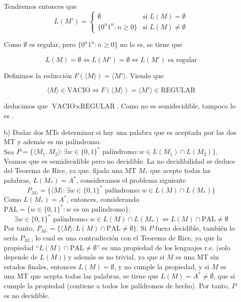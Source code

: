 \begin{ejercicio}
\begin{itemize}
        Tendremos entonces que $$L(M') = \begin{cases}
            \emptyset &\text{si } L(M) = \emptyset \\
            \{0^n 1^n : n \geq 0\} &\text{si } L(M) \neq \emptyset 
        \end{cases}$$

        Como $\emptyset$ es regular, pero $\{0^n 1^n : n \geq 0\}$ no lo es, se tiene que 

        $$L(M) = \emptyset \iff L(M') = \emptyset \iff L(M') \text{ es regular}$$

        Definimos la reducción $F(\langle M \rangle) = \langle M' \rangle$. Viendo que

        $$\langle M \rangle \in \text{VACIO} \iff F(\langle M \rangle) = \langle M' \rangle \in \text{REGULAR}$$

        deducimos que $\text{VACIO} \propto \text{REGULAR}$. Como  no es semidecidible, tampoco lo es 
        .

        \item[b)] Dadas dos MTs determinar si hay una palabra que es aceptada por las dos MT y 
        además es un palíndromo. \\ %

        Sea $P = \{\langle M_1, M_2 \rangle : \exists w \in \{0,1\}^{*} \text{ palíndromo} : w \in L(M_1) \cap L(M_2)\}$. 
        Veamos que es semidecidible pero no decidible. La no decidibilidad se deduce del Teorema de Rice, ya que, 
        fijada una MT $M_{*}$ que acepte todas las palabras, $L(M_*) = A^{*}$, consideramos el problema siguiente 
        $$P_{M_*} = \{\langle M \rangle : \exists w \in \{0,1\}^{*} \text{ palíndromo} : w \in L(M) \cap L(M_*)\}$$ 
        Como $L(M_*) = A^{*}$, entonces, considerando $\text{PAL} = \{w \in \{0,1\}^{*} : w \text{ es un palíndromo}\}$:
        $$\exists w \in \{0,1\}^{*} \text{ palíndromo} : w \in L(M) \cap L(M_*) \iff L(M) \cap \text{PAL} \neq \emptyset$$ 
        Por tanto, $P_{M_*} = \{\langle M \rangle : L(M) \cap \text{PAL} \neq \emptyset\}$. Si $P$ fuera decidible, 
        también lo sería $P_{M_*}$, lo cual es una contradicción con el Teorema de Rice, ya que la propiedad 
        ``$L(M) \cap \text{PAL} \neq \emptyset$'' es una propiedad de los lenguajes r.e. (solo depende de $L(M)$) y 
        además es no trivial, ya que si $M$ es una MT sin estados finales, entonces $L(M) = \emptyset$, y no cumple
        la propiedad, y si $M$ es una MT que acepta todas las palabras, se tiene que 
        $L(M) = A^{*} \neq \emptyset$, que sí cumple la propiedad (contiene a todos los palídromos de hecho). 
        Por tanto, $P$ es no decidible. \\


\end{itemize}
\end{ejercicio}
